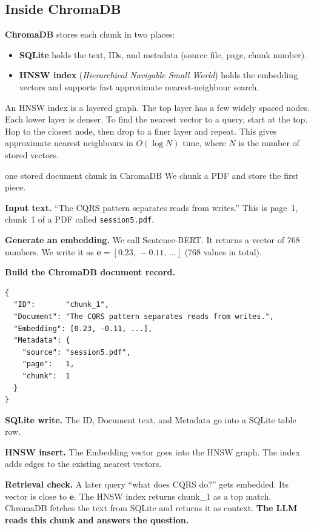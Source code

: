 \documentclass[a4paper,11pt]{article}
\newcommand{\vocab}[1]{\textbf{\color{navy}#1}}
\begin{document}
\subsection{Inside ChromaDB}

\vocab{ChromaDB} stores each chunk in two places:
\begin{itemize}
  \item \textbf{SQLite} holds the text, IDs, and metadata (source file, page, chunk number).
  \item \textbf{HNSW index} (\emph{Hierarchical Navigable Small World}) holds the embedding
    vectors and supports fast approximate nearest-neighbour search.
\end{itemize}

An HNSW index is a layered graph.
The top layer has a few widely spaced nodes.
Each lower layer is denser.
To find the nearest vector to a query, start at the top.
Hop to the closest node, then drop to a finer layer and repeat.
This gives approximate nearest neighbours in $O(\log N)$ time,
where $N$ is the number of stored vectors.

\begin{worked}{one stored document chunk in ChromaDB}
We chunk a PDF and store the first piece.
\begin{steps}
  \item \textbf{Input text.}
    ``The CQRS pattern separates reads from writes.''
    This is page~1, chunk~1 of a PDF called \texttt{session5.pdf}.
  \item \textbf{Generate an embedding.}
    We call Sentence-BERT.
    It returns a vector of 768 numbers.
    We write it as
    $\mathbf{e} = [0.23,\,-0.11,\,\ldots]$ (768 values in total).
  \item \textbf{Build the ChromaDB document record.}
\begin{Verbatim}[fontsize=\small,xleftmargin=2mm]
{
  "ID":       "chunk_1",
  "Document": "The CQRS pattern separates reads from writes.",
  "Embedding": [0.23, -0.11, ...],
  "Metadata": {
    "source": "session5.pdf",
    "page":   1,
    "chunk":  1
  }
}
\end{Verbatim}
  \item \textbf{SQLite write.}
    The ID, Document text, and Metadata go into a SQLite table row.
  \item \textbf{HNSW insert.}
    The Embedding vector goes into the HNSW graph.
    The index adds edges to the existing nearest vectors.
  \item \textbf{Retrieval check.}
    A later query ``what does CQRS do?'' gets embedded.
    Its vector is close to $\mathbf{e}$.
    The HNSW index returns chunk\_1 as a top match.
    ChromaDB fetches the text from SQLite and returns it as context.
    \textbf{The LLM reads this chunk and answers the question.}
\end{steps}
\end{worked}
\end{document}
